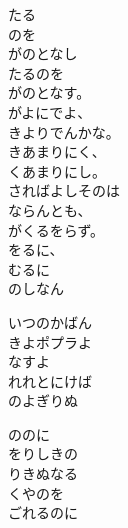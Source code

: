 \documentclass[10pt,b5j]{tarticle} %
\begin{document}
\vspace{1.5em} %
\newcommand{\linespace}{0.5em} %
\newcommand{\blocksize}{0.5\hsize} %
\begin{enumerate} %
    \begin{minipage}[c]{\blocksize}
    
        \vspace{\linespace}
        \item
        たる\\
        のを\\
        がのとなし\\
        たるのを\\
        がのとなす。\\
        がよにでよ、\\
        きよりでんかな。\\
        きあまりにく、\\
        くあまりにし。\\
        さればよしそのは\\
        ならんとも、\\
        がくるをらず。\\
        をるに、\\
        むるに\\
        のしなん
        
        \vspace{\linespace}
        \item
        いつのかばん\\
        きよポプラよ\\
        なすよ\\
        れれとにけば\\
        のよぎりぬ
        
        \vspace{\linespace}
        \item
        ののに\\
        をりしきの\\
        りきぬなる\\
        くやのを\\
        ごれるのに
        

\end{minipage}
\end{enumerate}
\end{document}
